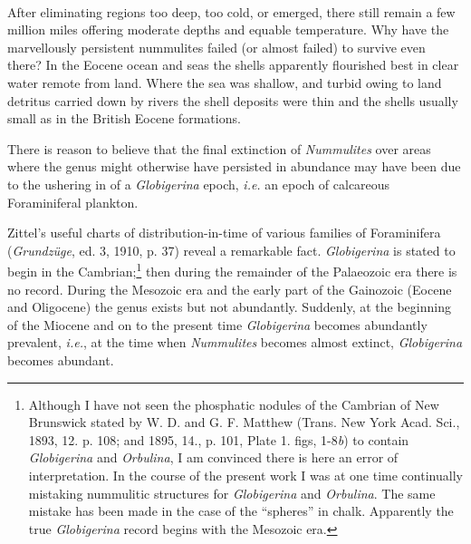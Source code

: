 \documentclass[a4paper, 12pt, oneside, landscape]{article}
\begin{document}
\paragraph{}
After eliminating regions too deep, too cold, or emerged, there still remain a few million miles offering moderate depths and equable temperature. Why have the marvellously persistent nummulites failed (or almost failed) to survive even there? In the Eocene ocean and seas the shells apparently flourished best in clear water remote from land. Where the sea was shallow, and turbid owing to land detritus carried down by rivers the shell deposits were thin and the shells usually small as in the British Eocene formations.

There is reason to believe that the final extinction of \emph{Nummulites} over areas where the genus might otherwise have persisted in abundance may have been due to the ushering in of a \emph{Globigerina} epoch, \emph{i.e.} an epoch of calcareous Foraminiferal plankton.

Zittel's useful charts of distribution-in-time of various families of Foraminifera (\emph{Grundzüge}, ed. 3, 1910, p. 37) reveal a remarkable fact. \emph{Globigerina} is stated to begin in the Cambrian;\footnote{Although I have not seen the phosphatic nodules of the Cambrian of New Brunswick stated by W. D. and G. F. Matthew (Trans. New York Acad. Sci., 1893, 12. p. 108; and 1895, 14., p. 101, Plate 1. figs, 1-8\emph{b}) to contain \emph{Globigerina} and \emph{Orbulina}, I am convinced there is here an error of interpretation. In the course of the present work I was at one time continually mistaking nummulitic structures for \emph{Globigerina} and \emph{Orbulina}. The same mistake has been made in the case of the ``spheres'' in chalk. Apparently the true \emph{Globigerina} record begins with the Mesozoic era.} then during the remainder of the Palaeozoic era there is no record. During the Mesozoic era and the early part of the Gainozoic (Eocene and Oligocene) the genus exists but not abundantly. Suddenly, at the beginning of the Miocene and on to the present time \emph{Globigerina} becomes abundantly prevalent, \emph{i.e.}, at the time when \emph{Nummulites} becomes almost extinct, \emph{Globigerina} becomes abundant.
\end{document}
